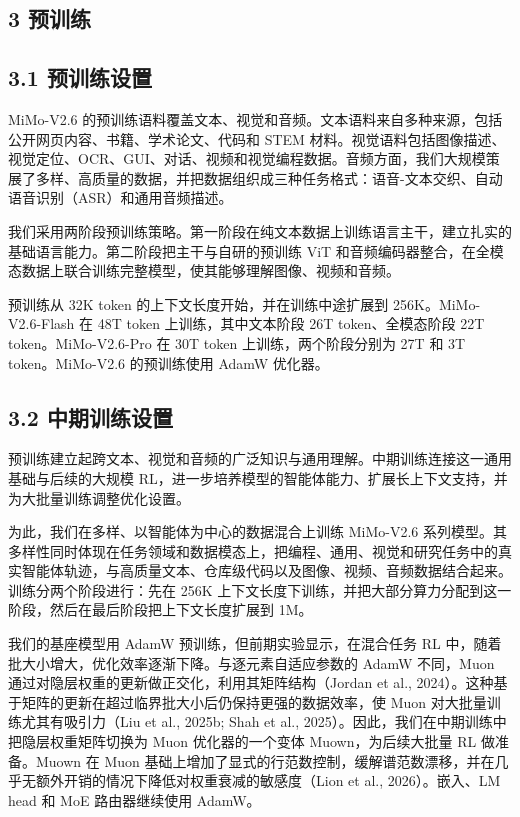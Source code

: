 \subsection{3 预训练}\label{pre-training}

\subsection{3.1 预训练设置}\label{pre-training-setup}

MiMo-V2.6 的预训练语料覆盖文本、视觉和音频。文本语料来自多种来源，包括公开网页内容、书籍、学术论文、代码和 STEM 材料。视觉语料包括图像描述、视觉定位、OCR、GUI、对话、视频和视觉编程数据。音频方面，我们大规模策展了多样、高质量的数据，并把数据组织成三种任务格式：语音-文本交织、自动语音识别（ASR）和通用音频描述。

我们采用两阶段预训练策略。第一阶段在纯文本数据上训练语言主干，建立扎实的基础语言能力。第二阶段把主干与自研的预训练 ViT 和音频编码器整合，在全模态数据上联合训练完整模型，使其能够理解图像、视频和音频。

预训练从 32K token 的上下文长度开始，并在训练中途扩展到 256K。MiMo-V2.6-Flash 在 48T token 上训练，其中文本阶段 26T token、全模态阶段 22T token。MiMo-V2.6-Pro 在 30T token 上训练，两个阶段分别为 27T 和 3T token。MiMo-V2.6 的预训练使用 AdamW 优化器。

\subsection{3.2 中期训练设置}\label{mid-training-setup}

预训练建立起跨文本、视觉和音频的广泛知识与通用理解。中期训练连接这一通用基础与后续的大规模 RL，进一步培养模型的智能体能力、扩展长上下文支持，并为大批量训练调整优化设置。

为此，我们在多样、以智能体为中心的数据混合上训练 MiMo-V2.6 系列模型。其多样性同时体现在任务领域和数据模态上，把编程、通用、视觉和研究任务中的真实智能体轨迹，与高质量文本、仓库级代码以及图像、视频、音频数据结合起来。训练分两个阶段进行：先在 256K 上下文长度下训练，并把大部分算力分配到这一阶段，然后在最后阶段把上下文长度扩展到 1M。

我们的基座模型用 AdamW 预训练，但前期实验显示，在混合任务 RL 中，随着批大小增大，优化效率逐渐下降。与逐元素自适应参数的 AdamW 不同，Muon 通过对隐层权重的更新做正交化，利用其矩阵结构（Jordan et al., 2024）。这种基于矩阵的更新在超过临界批大小后仍保持更强的数据效率，使 Muon 对大批量训练尤其有吸引力（Liu et al., 2025b; Shah et al., 2025）。因此，我们在中期训练中把隐层权重矩阵切换为 Muon 优化器的一个变体 Muown，为后续大批量 RL 做准备。Muown 在 Muon 基础上增加了显式的行范数控制，缓解谱范数漂移，并在几乎无额外开销的情况下降低对权重衰减的敏感度（Lion et al., 2026）。嵌入、LM head 和 MoE 路由器继续使用 AdamW。

